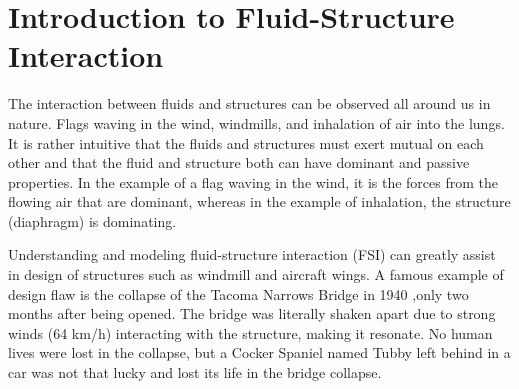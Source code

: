 \chapter{Introduction to Fluid-Structure Interaction}
The interaction between fluids and structures can be observed all around us in nature.
Flags waving in the wind, windmills, and inhalation of air into the lungs. It is rather intuitive that the fluids and structures must exert mutual on each other and that the fluid and structure both can have dominant and passive properties. In the example of a flag waving in the wind, it is the forces from the flowing air that are dominant, whereas in the example of inhalation, the structure (diaphragm) is dominating. 

Understanding and modeling fluid-structure interaction (FSI) can greatly assist in design of structures such as windmill and aircraft wings. A famous example of design flaw is the collapse of the Tacoma Narrows Bridge in 1940 \cite{Billah1991},only two months after being opened. The bridge was literally shaken apart due to strong winds (64 km/h) interacting with the structure, making it resonate. No human lives were lost in the collapse, but a Cocker Spaniel named Tubby left behind in a car was not that lucky and lost its life in the bridge collapse. \newline

